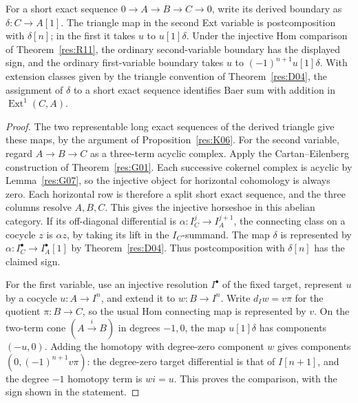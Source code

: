 \begin{proposition}\label{res:R13}
For a short exact sequence \(0\to A\to B\to C\to0\), write its derived
boundary as \(\delta:C\to A[1]\). The triangle map in the second Ext
variable is postcomposition with \(\delta[n]\); in the first it takes
\(u\) to \(u[1]\delta\). Under the injective Hom comparison of
Theorem~\ref{res:R11}, the ordinary second-variable boundary has the
displayed sign, and the ordinary first-variable boundary takes \(u\)
to \((-1)^{n+1}u[1]\delta\).
With extension classes given by the triangle convention of
Theorem~\ref{res:D04}, the assignment of \(\delta\) to a short exact
sequence identifies Baer sum with addition in \(\operatorname{Ext}^1(C,A)\).
\end{proposition}
\begin{proof}
The two representable long exact sequences of the derived triangle
give these maps, by the argument of Proposition~\ref{res:K06}.
For the second variable, regard \(A\to B\to C\) as a
three-term acyclic complex. Apply the Cartan--Eilenberg
construction of Theorem~\ref{res:G01}. Each successive
cokernel complex is acyclic by Lemma~\ref{res:G07}, so the
injective object for horizontal cohomology is always zero.
Each horizontal row is therefore a split short exact
sequence, and the three columns resolve \(A,B,C\).
This gives the injective horseshoe in this abelian category.
If its off-diagonal differential is
\(\alpha:I_C^j\to I_A^{j+1}\), the connecting class on a cocycle \(z\)
is \(\alpha z\), by taking its lift in the \(I_C\)-summand. The
map \(\delta\) is represented by \(\alpha:I_C^\bullet\to I_A^\bullet[1]\)
by Theorem~\ref{res:D04}. Thus postcomposition with \(\delta[n]\)
has the claimed sign.

For the first variable, use an injective resolution \(I^\bullet\) of
the fixed target, represent \(u\) by a cocycle \(u:A\to I^n\), and
extend it to \(w:B\to I^n\). Write \(d_Iw=v\pi\) for the quotient
\(\pi:B\to C\), so the usual Hom connecting map is represented by \(v\).
On the two-term cone \((A\xrightarrow{i}B)\) in degrees \(-1,0\),
the map \(u[1]\delta\) has components \((-u,0)\).
Adding the homotopy with degree-zero component \(w\) gives components
\((0,(-1)^{n+1}v\pi)\): the degree-zero target differential is that
of \(I[n+1]\), and the degree \(-1\) homotopy term is \(wi=u\).
This proves the comparison, with the sign shown in the statement.


\end{proof}
